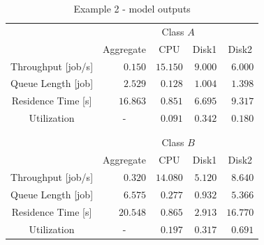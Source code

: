 \begin{table}[htbp]
\begin{center}
\begin{tabular}{c|r|r|r|r|}
&\multicolumn{4}{c|}{Class $A$}\\
& \multicolumn{1}{c|}{Aggregate} & \multicolumn{1}{c|}{CPU} & \multicolumn{1}{c|}{Disk1} & \multicolumn{1}{c|}{Disk2}\\
\hline Throughput [job/s]& $0.150$ & $15.150$ & $9.000$ & $6.000$\\
Queue Length [job]& $2.529$ & $0.128$ & $1.004$ & $1.398$\\
Residence Time [s]& $16.863$ & $0.851$ & $6.695$ & $9.317$\\
Utilization & \multicolumn{1}{c|}{-} & $0.091$ & $0.342$ & $0.180$\\
\hline \multicolumn{5}{c}{ }\\
\multicolumn{5}{c}{ }\\
&\multicolumn{4}{c|}{Class $B$}\\
& \multicolumn{1}{c|}{Aggregate} & \multicolumn{1}{c|}{CPU} & \multicolumn{1}{c|}{Disk1} & \multicolumn{1}{c|}{Disk2}\\
\hline Throughput [job/s]& $0.320$ & $14.080$ & $5.120$ & $8.640$\\
Queue Length [job]& $6.575$ & $0.277$ & $0.932$ & $5.366$\\
Residence Time [s]& $20.548$ & $0.865$ & $2.913$ & $16.770$\\
Utilization & \multicolumn{1}{c|}{-} & $0.197$ & $0.317$ & $0.691$\\
\hline
\end{tabular}

\end{center}
\caption{Example 2 - model outputs} \label{tab:jmva:example2results}
\end{table}

